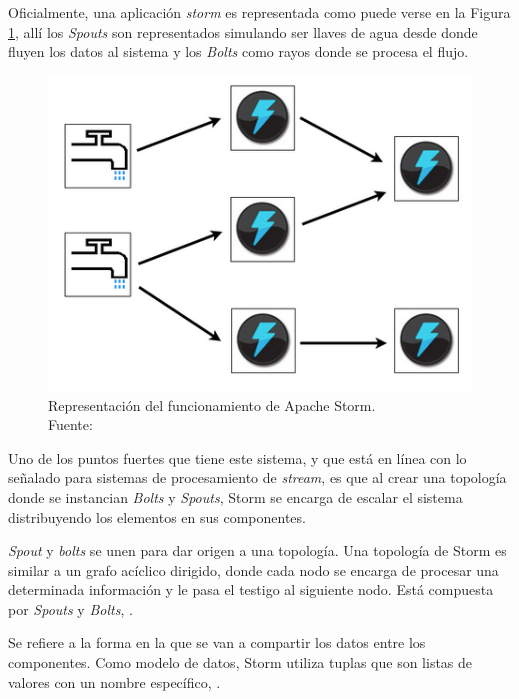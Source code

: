 Oficialmente, una aplicación \textit{storm} es representada como puede verse en la Figura \ref{fig:stormBeLike}, allí los \textit{Spouts} son representados simulando ser llaves de agua desde donde fluyen los datos al sistema y los \textit{Bolts} como rayos donde se procesa el flujo.

\begin{figure}[H]
	\centering
	\captionsetup{justification=centering}
	\includegraphics[scale=0.6]{images/stormBeLike.png}
	\caption[Representación del funcionamiento de Apache Storm.]{Representación del funcionamiento de Apache Storm.\\Fuente: \cite{StormFigure}}
	\label{fig:stormBeLike}
\end{figure}

Uno de los puntos fuertes que tiene este sistema, y que está en línea con lo señalado para sistemas de procesamiento de \textit{stream}, es que al crear una topología donde se instancian \textit{Bolts} y \textit{Spouts}, Storm se encarga de escalar el sistema distribuyendo los elementos en sus componentes.

\textit{Spout} y \textit{bolts} se unen para dar origen a una topología. Una topología de Storm es similar a un grafo acíclico dirigido, donde cada nodo se encarga de procesar una determinada información y le pasa el testigo al siguiente nodo. Está compuesta por \textit{Spouts} y \textit{Bolts}, \cite{Storm}.

Se refiere a la forma en la que se van a compartir los datos entre los componentes. Como modelo de datos, Storm utiliza tuplas que son listas de valores con un nombre específico, \cite{Storm}.

